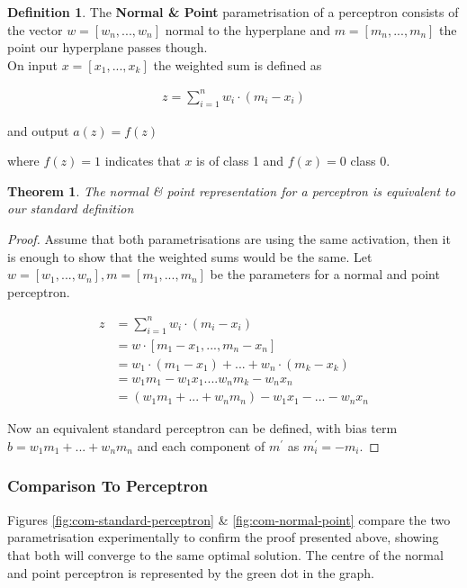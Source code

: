 \documentclass[notitlepage]{report}
\newtheorem{theorem}{Theorem}
\theoremstyle{definition}
\newtheorem{definition}{Definition}[section]
\begin{document}
\theoremstyle{definition}
\begin{definition}
	The \textbf{Normal \& Point} parametrisation of a perceptron consists of the vector $w = [w_n, ..., w_n]$ normal to the hyperplane and $m = [m_n, ..., m_n]$ the point our hyperplane passes though.\\
	
	On input $x = [x_1, ..., x_k]$ the weighted sum is defined as 
	
	\begin{align*}
	z = \sum_{i=1}^n w_i \cdot (m_i - x_i)
	\end{align*}
	
	and output $a(z) = f(z)$
	
	where $f(z) = 1$ indicates that $x$ is of class 1 and $f(x) = 0$ class 0.
\end{definition}

\begin{theorem}
The normal \& point representation for a perceptron is equivalent to our standard definition
\end{theorem}

\begin{proof}
Assume that both parametrisations are using the same activation, then it is enough to show that the weighted sums would be the same. Let $w = [w_1, ..., w_n], m = [m_1, ..., m_n]$ be the parameters for a normal and point perceptron.

\begin{align*}
z &= \sum_{i=1}^n w_i \cdot (m_i - x_i)\\
&= w \cdot [m_1 - x_1, ..., m_n - x_n]\\
&= w_1 \cdot (m_1 - x_1) + ... + w_n \cdot (m_k - x_k)\\
&= w_1m_1 - w_1x_1 .... w_nm_k - w_nx_n\\
&= (w_1m_1 + ... + w_nm_n) - w_1x_1 - ... - w_nx_n
\end{align*}

Now an equivalent standard perceptron can be defined, with bias term $b = w_1m_1 + ... + w_nm_n$ and each component of $m^{'}$ as $m^{'}_i = -m_i$.
\end{proof}

\subsubsection{Comparison To Perceptron}
Figures \ref{fig:com-standard-perceptron} \& \ref{fig:com-normal-point} compare the two parametrisation experimentally to confirm the proof presented above, showing that both will converge to the same optimal solution. The centre of the normal and point perceptron is represented by the green dot in the graph.\\
\end{document}

